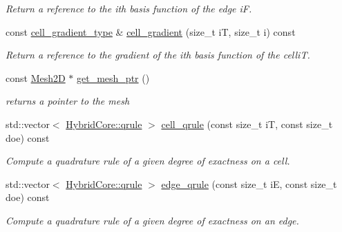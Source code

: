 \begin{DoxyCompactItemize}
\begin{DoxyCompactList}\small\item\em Return a reference to the i\textquotesingle{}th basis function of the edge iF. \end{DoxyCompactList}\item 
const \hyperlink{classHCore2D_1_1HybridCore_ae6a6ebafdb90354417d0068dd75134cd}{cell\+\_\+gradient\+\_\+type} \& \hyperlink{classHCore2D_1_1HybridCore_a710fc23b914623b90a2699ab4291e539}{cell\+\_\+gradient} (size\+\_\+t iT, size\+\_\+t i) const
\begin{DoxyCompactList}\small\item\em Return a reference to the gradient of the i\textquotesingle{}th basis function of the celliT. \end{DoxyCompactList}\item 
\mbox{\label{classHCore2D_1_1HybridCore_a761aa45132a8857c632f30f92b349bfc}} 
const \hyperlink{classHCore2D_1_1Mesh2D}{Mesh2D} $\ast$ \hyperlink{classHCore2D_1_1HybridCore_a761aa45132a8857c632f30f92b349bfc}{get\+\_\+mesh\+\_\+ptr} ()
\begin{DoxyCompactList}\small\item\em returns a pointer to the mesh \end{DoxyCompactList}\item 
std\+::vector$<$ \hyperlink{structHCore2D_1_1HybridCore_1_1qrule}{Hybrid\+Core\+::qrule} $>$ \hyperlink{classHCore2D_1_1HybridCore_a9ecd6ca61d4f9e3f3e3af81d8de394d0}{cell\+\_\+qrule} (const size\+\_\+t iT, const size\+\_\+t doe) const
\begin{DoxyCompactList}\small\item\em Compute a quadrature rule of a given degree of exactness on a cell. \end{DoxyCompactList}\item 
std\+::vector$<$ \hyperlink{structHCore2D_1_1HybridCore_1_1qrule}{Hybrid\+Core\+::qrule} $>$ \hyperlink{classHCore2D_1_1HybridCore_a448297d0d0afefe477815dfb7821b270}{edge\+\_\+qrule} (const size\+\_\+t iE, const size\+\_\+t doe) const
\begin{DoxyCompactList}\small\item\em Compute a quadrature rule of a given degree of exactness on an edge. \end{DoxyCompactList}\item 
\mbox{\label{classHCore2D_1_1HybridCore_a4571fff91492781ebb01849b1063e626}} 

\end{DoxyCompactItemize}

